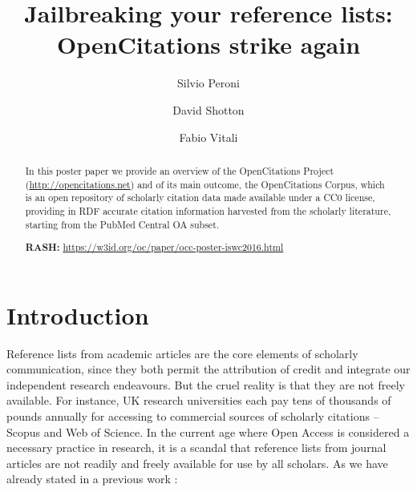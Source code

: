 \documentclass[runningheads,a4paper]{llncs}
\begin{document}
\mainmatter

\title{Jailbreaking your reference lists:\\ OpenCitations strike again}
\author{Silvio Peroni \and
David Shotton \and
Fabio Vitali}
\maketitle

\begin{abstract}
In this poster paper we provide an overview of the OpenCitations Project (\url{http://opencitations.net}) and of its main outcome, the OpenCitations Corpus, which is an open repository of scholarly citation data made available under a CC0 license, providing in RDF accurate citation information harvested from the scholarly literature, starting from the PubMed Central OA subset.

{\bf RASH:} \url{https://w3id.org/oc/paper/occ-poster-iswc2016.html}

\end{abstract}


\section{Introduction}

Reference lists from academic articles are the core elements of scholarly communication, since they both permit the attribution of credit and integrate our independent research endeavours. But the cruel reality is that they are not freely available. For instance, UK research universities each pay tens of thousands of pounds annually  \cite{__RefNumPara__293_1852566440} for accessing to commercial sources of scholarly citations -- Scopus and Web of Science. In the current age where Open Access is considered a necessary practice in research, it is a scandal that reference lists from journal articles are not readily and freely available for use by all scholars. As we have already stated in a previous work  \cite{__RefNumPara__293_1852566440}: 
\end{document}

